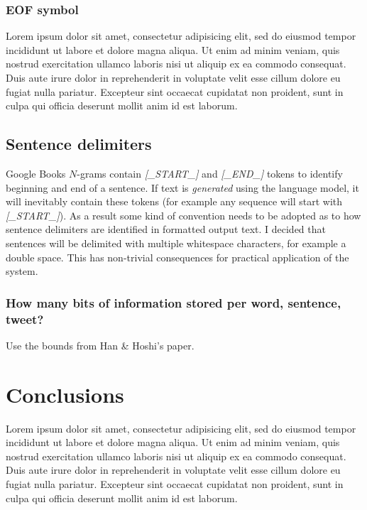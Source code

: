 \documentclass[draft]{IIBproject}
\DeclareRobustCommand{\ngram}[1]{\emph{[#1]}}
\begin{document}
\subsubsection{EOF symbol}

Lorem ipsum dolor sit amet, consectetur adipisicing elit, sed do eiusmod tempor incididunt ut labore et dolore magna aliqua. Ut enim ad minim veniam, quis nostrud exercitation ullamco laboris nisi ut aliquip ex ea commodo consequat. Duis aute irure dolor in reprehenderit in voluptate velit esse cillum dolore eu fugiat nulla pariatur. Excepteur sint occaecat cupidatat non proident, sunt in culpa qui officia deserunt mollit anim id est laborum.

\subsection{Sentence delimiters}

Google Books $N$-grams contain \ngram{\_START\_} and \ngram{\_END\_} tokens to identify beginning and end of a sentence. If text is \emph{generated} using the language model, it will inevitably contain these tokens (for example any sequence will start with \ngram{\_START\_}). As a result some kind of convention needs to be adopted as to how sentence delimiters are identified in formatted output text. I decided that sentences will be delimited with multiple whitespace characters, for example a double space. This has non-trivial consequences for practical application of the system.

\subsubsection{How many bits of information stored per word, sentence, tweet?}

Use the bounds from Han \& Hoshi's paper.

\clearpage
\section{Conclusions}

Lorem ipsum dolor sit amet, consectetur adipisicing elit, sed do eiusmod tempor incididunt ut labore et dolore magna aliqua. Ut enim ad minim veniam, quis nostrud exercitation ullamco laboris nisi ut aliquip ex ea commodo consequat. Duis aute irure dolor in reprehenderit in voluptate velit esse cillum dolore eu fugiat nulla pariatur. Excepteur sint occaecat cupidatat non proident, sunt in culpa qui officia deserunt mollit anim id est laborum.
\end{document}

